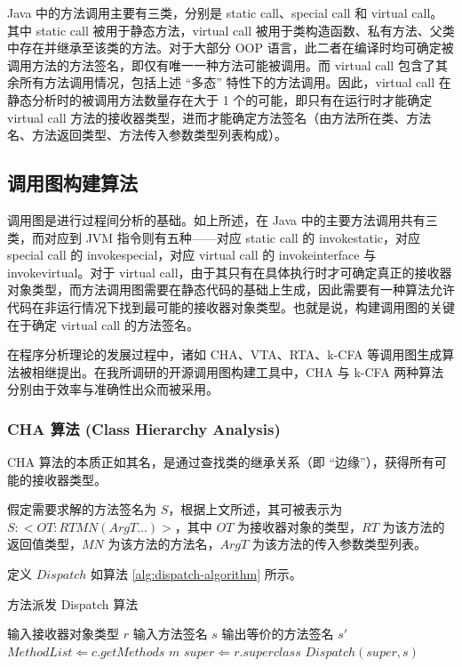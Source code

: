 Java 中的方法调用主要有三类，分别是 static call、special call 和 virtual call。其中 static call 被用于静态方法，virtual call 被用于类构造函数、私有方法、父类中存在并继承至该类的方法。对于大部分 OOP 语言，此二者在编译时均可确定被调用方法的方法签名，即仅有唯一一种方法可能被调用。而 virtual call 包含了其余所有方法调用情况，包括上述 “多态” 特性下的方法调用。因此，virtual call 在静态分析时的被调用方法数量存在大于 1 个的可能，即只有在运行时才能确定 virtual call 方法的接收器类型，进而才能确定方法签名（由方法所在类、方法名、方法返回类型、方法传入参数类型列表构成）\cite{10.1145/263700.264352}。

\subsection{调用图构建算法}

调用图是进行过程间分析的基础。如上所述，在 Java 中的主要方法调用共有三类，而对应到 JVM 指令则有五种——对应 static call 的 invokestatic，对应 special call 的 invokespecial，对应 virtual call 的 invokeinterface 与 invokevirtual。对于 virtual call，由于其只有在具体执行时才可确定真正的接收器对象类型，而方法调用图需要在静态代码的基础上生成，因此需要有一种算法允许代码在非运行情况下找到最可能的接收器对象类型。也就是说，构建调用图的关键在于确定 virtual call 的方法签名。

在程序分析理论的发展过程中，诸如 CHA、VTA、RTA、k-CFA 等调用图生成算法被相继提出。在我所调研的开源调用图构建工具中，CHA 与 k-CFA 两种算法分别由于效率与准确性出众而被采用。

\subsubsection{CHA 算法 (Class Hierarchy Analysis)}

CHA 算法的本质正如其名，是通过查找类的继承关系（即 “边缘”），获得所有可能的接收器类型。

假定需要求解的方法签名为 $S$，根据上文所述，其可被表示为 $S: <OT: RT MN(ArgT...)>$，其中 $OT$ 为接收器对象的类型，$RT$ 为该方法的返回值类型，$MN$ 为该方法的方法名，$ArgT$ 为该方法的传入参数类型列表。

定义 $Dispatch$ 如算法 \ref{alg:dispatch-algorithm} 所示。

\vskip 13.8pt
\renewcommand{\thealgorithm}{5}
    \begin{algorithm}
        \caption{方法派发 Dispatch 算法}
        \begin{algorithmic}[1]
            \Require 输入接收器对象类型 $r$
            \Require 输入方法签名 $s$
            \Ensure 输出等价的方法签名 $s'$
            \State $MethodList \Leftarrow c.getMethods$
                    \State \Return $m$
                \EndIf
            \EndFor
            \State $super \Leftarrow r.superclass$
            \State \Return $Dispatch(super, s)$
        \end{algorithmic}
        \label{alg:dispatch-algorithm}
    \end{algorithm}
    \vskip 13.8pt

